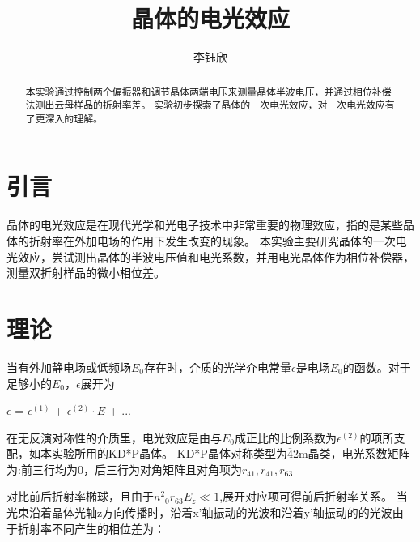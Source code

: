 \documentclass[font=default]{mpltx}
\makeatletter
\newcommand\releasedate{%
    \href{https://github.com/CastleStar14654/PKUMpLtX/releases/tag/\mpltx@fileversion}%
        {\mpltx@filedate, \mpltx@fileversion}}
\makeatother
\begin{document}
\title{晶体的电光效应} %
\author{李钰欣} %
\date{}
\begin{abstract}
  本实验通过控制两个偏振器和调节晶体两端电压来测量晶体半波电压，并通过相位补偿法测出云母样品的折射率差。
  实验初步探索了晶体的一次电光效应，对一次电光效应有了更深入的理解。
\end{abstract}

\maketitle

\section{引言}

晶体的电光效应是在现代光学和光电子技术中非常重要的物理效应，指的是某些晶体的折射率在外加电场的作用下发生改变的现象。
本实验主要研究晶体的一次电光效应，尝试测出晶体的半波电压值和电光系数，并用电光晶体作为相位补偿器，测量双折射样品的微小相位差。

 
\section{理论}\label{sec:theory}
当有外加静电场或低频场$E_0$存在时，介质的光学介电常量$\epsilon$是电场$E_0$的函数。对于足够小的$E_0$，$\epsilon$展开为

$\epsilon$ = $\epsilon^{(1)}$ + $\epsilon^{(2)}\cdot E$ + ...

在无反演对称性的介质里，电光效应是由与$E_0$成正比的比例系数为$\epsilon^{(2)}$的项所支配，如本实验所用的KD*P晶体。
KD*P晶体对称类型为$\overline{4}$2m晶类，电光系数矩阵为:前三行均为0，后三行为对角矩阵且对角项为$r_{41},r_{41},r_{63}$


对比前后折射率椭球，且由于${n^2}_0$$r_{63} E_z \ll 1$,展开对应项可得前后折射率关系。
当光束沿着晶体光轴z方向传播时，沿着x'轴振动的光波和沿着y'轴振动的的光波由于折射率不同产生的相位差为：
\end{document}
